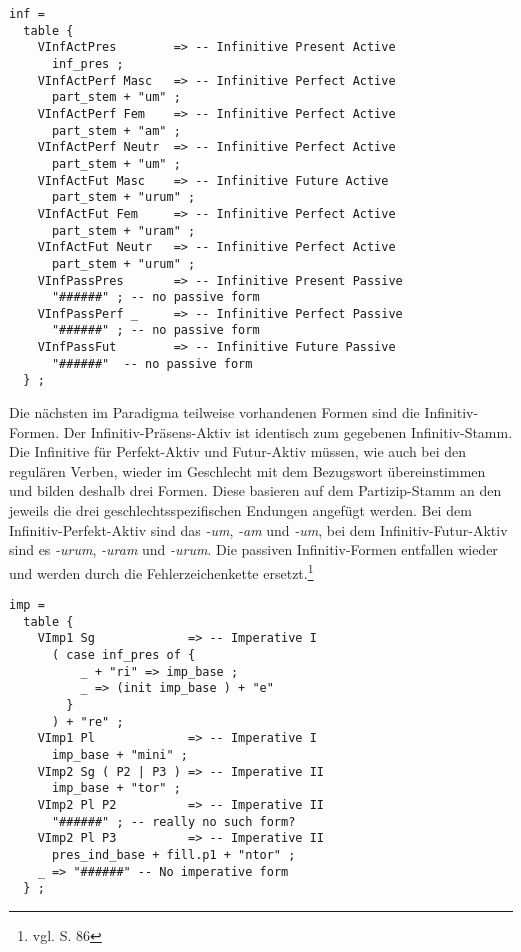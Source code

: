 \begin{lstlisting}[float=h!tp,caption={Ausschnitt aus der Funktion \texttt{mkDeponent} um Infinitiv-Verbformen zu bilden (vgl. \textbf{ResLat.gf})},label={GF-Res-MkDeponent-Inf},basicstyle=\small]
inf = 
  table {
    VInfActPres        => -- Infinitive Present Active
      inf_pres ;
    VInfActPerf Masc   => -- Infinitive Perfect Active
      part_stem + "um" ;
    VInfActPerf Fem    => -- Infinitive Perfect Active
      part_stem + "am" ;
    VInfActPerf Neutr  => -- Infinitive Perfect Active
      part_stem + "um" ;
    VInfActFut Masc    => -- Infinitive Future Active
      part_stem + "urum" ;
    VInfActFut Fem     => -- Infinitive Perfect Active
      part_stem + "uram" ; 
    VInfActFut Neutr   => -- Infinitive Perfect Active
      part_stem + "urum" ;
    VInfPassPres       => -- Infinitive Present Passive
      "######" ; -- no passive form
    VInfPassPerf _     => -- Infinitive Perfect Passive
      "######" ; -- no passive form
    VInfPassFut        => -- Infinitive Future Passive
      "######"  -- no passive form
  } ;
\end{lstlisting}
Die nächsten im Paradigma teilweise vorhandenen Formen sind die Infinitiv-Formen. Der Infinitiv-Präsens-Aktiv ist identisch zum gegebenen Infinitiv-Stamm. Die Infinitive für Perfekt-Aktiv und Futur-Aktiv müssen, wie auch bei den regulären Verben, wieder im Geschlecht mit dem Bezugswort übereinstimmen und bilden deshalb drei Formen. Diese basieren auf dem Partizip-Stamm an den jeweils die drei geschlechtsspezifischen Endungen angefügt werden. Bei dem Infinitiv-Perfekt-Aktiv sind das \textit{-um}, \textit{-am} und \textit{-um}, bei dem Infinitiv-Futur-Aktiv sind es \textit{-urum}, \textit{-uram} und \textit{-urum}. Die passiven Infinitiv-Formen entfallen wieder und werden durch die Fehlerzeichenkette ersetzt.\footnote{vgl. \cite{BAYER-LINDAUER1994} S. 86} \par
\begin{lstlisting}[float=h!tp,caption={Ausschnitt aus der Funktion \texttt{mkDeponent} um Imperativ-Verbformen zu bilden (vgl. \textbf{ResLat.gf})},label={GF-Res-MkDeponent-Imp},basicstyle=\small]
imp = 
  table {
    VImp1 Sg             => -- Imperative I
      ( case inf_pres of {
          _ + "ri" => imp_base ;
          _ => (init imp_base ) + "e" 
        }
      ) + "re" ;
    VImp1 Pl             => -- Imperative I
      imp_base + "mini" ;
    VImp2 Sg ( P2 | P3 ) => -- Imperative II
      imp_base + "tor" ;
    VImp2 Pl P2          => -- Imperative II
      "######" ; -- really no such form?
    VImp2 Pl P3          => -- Imperative II
      pres_ind_base + fill.p1 + "ntor" ;
    _ => "######" -- No imperative form
  } ;
\end{lstlisting}
